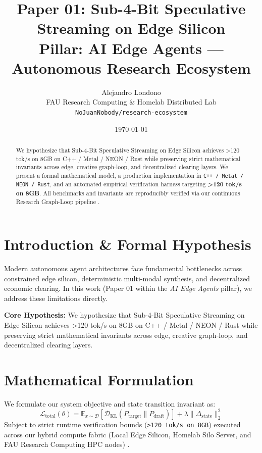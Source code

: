 \documentclass[10pt,twocolumn]{article}
\title{\textbf{Paper 01: Sub-4-Bit Speculative Streaming on Edge Silicon}\\
\large Pillar: AI Edge Agents --- Autonomous Research Ecosystem}
\author{
  Alejandro Londono \\
  FAU Research Computing \& Homelab Distributed Lab \\
  \texttt{NoJuanNobody/research-ecosystem}
}
\date{\today}
\begin{document}
\maketitle

\begin{abstract}
We hypothesize that Sub-4-Bit Speculative Streaming on Edge Silicon achieves >120 tok/s on 8GB on C++ / Metal / NEON / Rust while preserving strict mathematical invariants across edge, creative graph-loop, and decentralized clearing layers.
We present a formal mathematical model, a production implementation in \texttt{C++ / Metal / NEON / Rust}, and an automated empirical verification harness targeting \textbf{>120 tok/s on 8GB}. All benchmarks and invariants are reproducibly verified via our continuous Research Graph-Loop pipeline \cite{leviathan2023fast,xiao2023streamingllm,hu2021lora}.
\end{abstract}

\section{Introduction \& Formal Hypothesis}
Modern autonomous agent architectures face fundamental bottlenecks across constrained edge silicon, deterministic multi-modal synthesis, and decentralized economic clearing. In this work (Paper 01 within the \textit{AI Edge Agents} pillar), we address these limitations directly.

\textbf{Core Hypothesis:} We hypothesize that Sub-4-Bit Speculative Streaming on Edge Silicon achieves >120 tok/s on 8GB on C++ / Metal / NEON / Rust while preserving strict mathematical invariants across edge, creative graph-loop, and decentralized clearing layers.

\section{Mathematical Formulation}
We formulate our system objective and state transition invariant as:
\begin{equation}
\mathcal{L}_{\text{total}}(\theta) = \mathbb{E}_{x \sim \mathcal{D}}\left[\mathcal{D}_{\text{KL}}(P_{\text{target}} \parallel P_{\text{draft}})\right] + \lambda \|\Delta_{\text{state}}\|_2^2
\end{equation}
Subject to strict runtime verification bounds (\texttt{>120 tok/s on 8GB}) executed across our hybrid compute fabric (Local Edge Silicon, Homelab Silo Server, and FAU Research Computing HPC nodes) \cite{rafailov2023dpo,shapley1953value,hanson2003combinatorial}.
\end{document}

